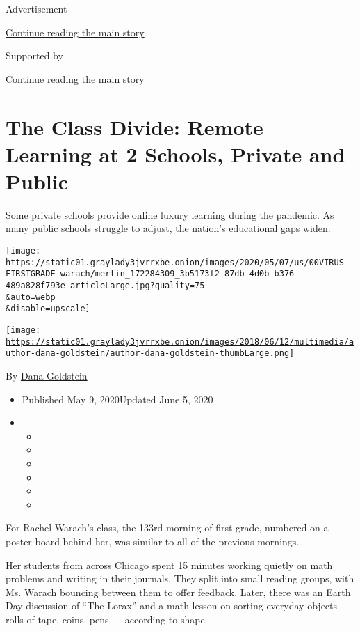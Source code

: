 Advertisement

\protect\hyperlink{after-top}{Continue reading the main story}

Supported by

\protect\hyperlink{after-sponsor}{Continue reading the main story}

\hypertarget{the-class-divide-remote-learning-at-2-schools-private-and-public}{%
\section{The Class Divide: Remote Learning at 2 Schools, Private and
Public}\label{the-class-divide-remote-learning-at-2-schools-private-and-public}}

Some private schools provide online luxury learning during the pandemic.
As many public schools struggle to adjust, the nation's educational gaps
widen.

\texttt{[image: https://static01.graylady3jvrrxbe.onion/images/2020/05/07/us/00VIRUS-FIRSTGRADE-warach/merlin\_172284309\_3b5173f2-87db-4d0b-b376-489a828f793e-articleLarge.jpg?quality=75\\\&auto=webp\\\&disable=upscale]}

\href{https://www.nytimes3xbfgragh.onion/by/dana-goldstein}{\texttt{[image: https://static01.graylady3jvrrxbe.onion/images/2018/06/12/multimedia/author-dana-goldstein/author-dana-goldstein-thumbLarge.png]}}

By \href{https://www.nytimes3xbfgragh.onion/by/dana-goldstein}{Dana
Goldstein}

\begin{itemize}
\item
  Published May 9, 2020Updated June 5, 2020
\item
  \begin{itemize}
  \item
  \item
  \item
  \item
  \item
  \item
  \end{itemize}
\end{itemize}

For Rachel Warach's class, the 133rd morning of first grade, numbered on
a poster board behind her, was similar to all of the previous mornings.

Her students from across Chicago spent 15 minutes working quietly on
math problems and writing in their journals. They split into small
reading groups, with Ms. Warach bouncing between them to offer feedback.
Later, there was an Earth Day discussion of ``The Lorax'' and a math
lesson on sorting everyday objects --- rolls of tape, coins, pens ---
according to shape.

